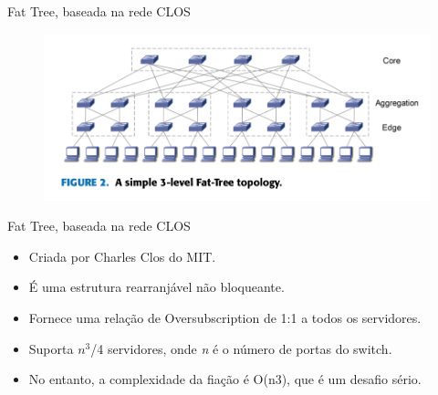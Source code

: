 \documentclass[aspectratio=169]{beamer}
\begin{document}
     
     
      \begin{frame} {Fat Tree, baseada na rede CLOS}
             \begin{figure}[ht]    
                 \includegraphics[scale=0.38]{fat_tree.png}
                 
                
                 \label{fig:consumo}
             \end{figure}
 
      
      \end{frame}
      

    \begin{frame} {Fat Tree, baseada na rede CLOS}
          
  	
      \Large
      \begin{itemize}
                         
       \item
              Criada por Charles Clos do MIT.
                          
       \item
          	É uma estrutura rearranjável não bloqueante.
       \item
          Fornece uma relação de Oversubscription de 1:1 a todos os servidores.
         
        \item
        	Suporta $n^3$/4 servidores, onde \textit{n} é o número de portas do switch.
       	\item
       		No entanto, a complexidade da fiação é O(n3), que é um desafio sério.
  
      \end{itemize}
         
    
    \end{frame}
      
      
      
\end{document}
